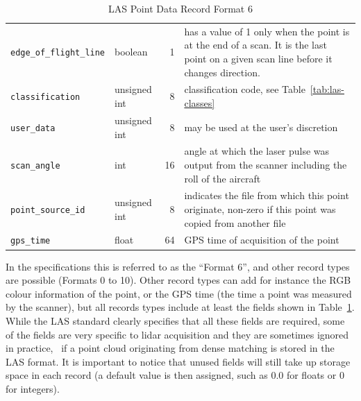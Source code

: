 \begin{table}
\begin{tabular}{l|l|r|p{7cm}}
    \texttt{edge\_of\_flight\_line} & boolean & 1 & has a value of 1 only when the point is at the end of a scan. It is the last point on a given scan line before it changes direction. \\ 
    \texttt{classification} & unsigned int & 8 & classification code, see Table~\ref{tab:las-classes} \\ 
    \texttt{user\_data} & unsigned int & 8 &  may be used at the user's discretion \\ 
    \texttt{scan\_angle} & int & 16 & angle at which the laser pulse was output from the scanner including the roll of the aircraft \\ 
    \texttt{point\_source\_id} & unsigned int & 8 & indicates the file from which this point originate, non-zero if this point was copied from another file\\
    \texttt{gps\_time} & float & 64 & GPS time of acquisition of the point\\
  \end{tabular}
\caption{LAS Point Data Record Format 6}%
\label{tab:las-record}
\end{table}
In the specifications this is referred to as the ``Format 6'', and other record types are possible (Formats 0 to 10).
Other record types can add for instance the RGB colour information of the point, or the GPS time (the time a point was measured by the scanner), but all records types include at least the fields shown in Table~\ref{tab:las-record}.
While the LAS standard clearly specifies that all these fields are required, some of the fields are very specific to lidar acquisition and they are sometimes ignored in practice, \eg\ if a point cloud originating from dense matching is stored in the LAS format.
It is important to notice that unused fields will still take up storage space in each record (a default value is then assigned, such as 0.0 for floats or 0 for integers).

